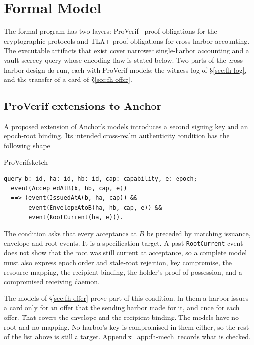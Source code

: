 \documentclass[11pt,a4paper]{article}
\theoremstyle{definition}
\theoremstyle{remark}
\begin{document}
\section{Formal Model}\label{sec:fh-formal}


The formal program has two layers: ProVerif~ proof obligations for the cryptographic protocols and TLA+ proof obligations for cross-harbor accounting. The executable artifacts that exist cover narrower single-harbor accounting and a vault-secrecy query whose encoding flaw is stated below. Two parts of the cross-harbor design do run, each with ProVerif models: the witness log of \S\ref{sec:fh-log}, and the transfer of a card of \S\ref{sec:fh-offer}.

\subsection{ProVerif extensions to Anchor}\label{sec:fh-proverif-ext}

A proposed extension of Anchor's models introduces a second signing key and an epoch-root binding. Its intended cross-realm authenticity condition has the following shape:

\begin{pdlisting}{ProVerif}{sketch}
\begin{lstlisting}[caption={Cross-realm authenticity query (sketch)},style=proverif]
query b: id, ha: id, hb: id, cap: capability, e: epoch;
  event(AcceptedAtB(b, hb, cap, e))
  ==> (event(IssuedAtA(b, ha, cap)) &&
       event(EnvelopeAtoB(ha, hb, cap, e)) &&
       event(RootCurrent(ha, e))).
\end{lstlisting}
\end{pdlisting}

The condition asks that every acceptance at $B$ be preceded by matching issuance, envelope and root events. It is a specification target. A past \texttt{RootCurrent} event does not show that the root was still current at acceptance, so a complete model must also express epoch order and stale-root rejection, key compromise, the resource mapping, the recipient binding, the holder's proof of possession, and a compromised receiving daemon.

The models of \S\ref{sec:fh-offer} prove part of this condition. In them a harbor issues a card only for an offer that the sending harbor made for it, and once for each offer. That covers the envelope and the recipient binding. The models have no root and no mapping. No harbor's key is compromised in them either, so the rest of the list above is still a target. Appendix~\ref{app:fh-mech} records what is checked.
\end{document}
